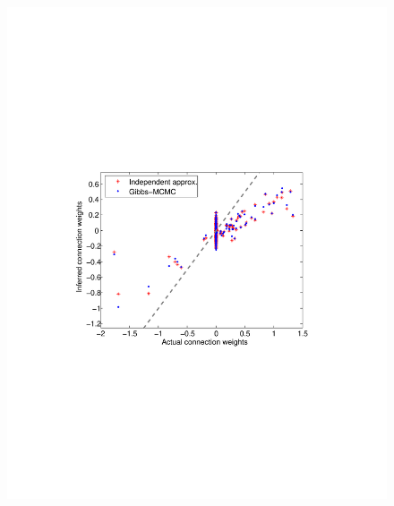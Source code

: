 \begin{figure}
\centering
\begin{minipage}[c]{0.45\hsize}
\includegraphics[width=\hsize]{../figs/Figure1_fluor_mcmc_vs_iid}
\end{minipage}
\begin{minipage}[c]{0.45\hsize}

\end{minipage}
\end{figure}

